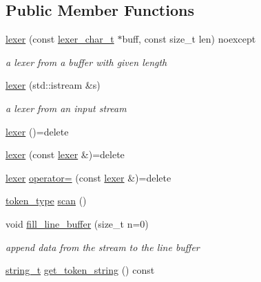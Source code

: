 \subsection*{Public Member Functions}
\begin{DoxyCompactItemize}
\item 
\hyperlink{classnlohmann_1_1basic__json_1_1lexer_a6f8eac8d6d2b95ce3f10b04104ecda8d}{lexer} (const \hyperlink{classnlohmann_1_1basic__json_1_1lexer_abe04be04d0575249f8806c334bacbc80}{lexer\+\_\+char\+\_\+t} $\ast$buff, const size\+\_\+t len) noexcept
\begin{DoxyCompactList}\small\item\em a lexer from a buffer with given length \end{DoxyCompactList}\item 
\hyperlink{classnlohmann_1_1basic__json_1_1lexer_aa85fafea3a014e6226be866d33112c49}{lexer} (std\+::istream \&s)
\begin{DoxyCompactList}\small\item\em a lexer from an input stream \end{DoxyCompactList}\item 
\hyperlink{classnlohmann_1_1basic__json_1_1lexer_a45c85aa63e95ac8640449e6643c61414}{lexer} ()=delete
\item 
\hyperlink{classnlohmann_1_1basic__json_1_1lexer_a771415d8d7ef845c1969fa67b67877c2}{lexer} (const \hyperlink{classnlohmann_1_1basic__json_1_1lexer}{lexer} \&)=delete
\item 
\hyperlink{classnlohmann_1_1basic__json_1_1lexer}{lexer} \hyperlink{classnlohmann_1_1basic__json_1_1lexer_aec615034104f3b6b68343f14908df04d}{operator=} (const \hyperlink{classnlohmann_1_1basic__json_1_1lexer}{lexer} \&)=delete
\item 
\hyperlink{classnlohmann_1_1basic__json_1_1lexer_a96887d6cd131e3d3a85a9d71fbdbcdf7}{token\+\_\+type} \hyperlink{classnlohmann_1_1basic__json_1_1lexer_aa2bf285bc6ee37e2af87dfd627224b41}{scan} ()
\item 
void \hyperlink{classnlohmann_1_1basic__json_1_1lexer_a0b137b9457f558c4b2352259b12ed5ff}{fill\+\_\+line\+\_\+buffer} (size\+\_\+t n=0)
\begin{DoxyCompactList}\small\item\em append data from the stream to the line buffer \end{DoxyCompactList}\item 
\hyperlink{classnlohmann_1_1basic__json_a61f8566a1a85a424c7266fb531dca005}{string\+\_\+t} \hyperlink{classnlohmann_1_1basic__json_1_1lexer_afa23a2d0ad20b047487d388fd4e75657}{get\+\_\+token\+\_\+string} () const

\end{DoxyCompactItemize}
